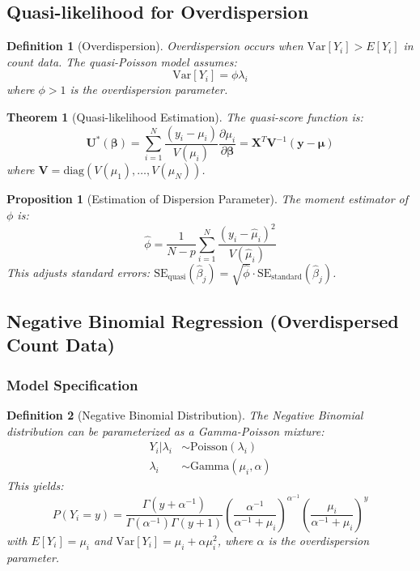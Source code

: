 \documentclass{article}
\newtheorem{definition}{Definition}
\newtheorem{theorem}{Theorem}
\newtheorem{proposition}{Proposition}
\begin{document}
\subsection{Quasi-likelihood for Overdispersion}

\begin{definition}[Overdispersion]
Overdispersion occurs when $\text{Var}[Y_i] > E[Y_i]$ in count data. The quasi-Poisson model assumes:
\begin{equation}
\text{Var}[Y_i] = \phi \lambda_i
\end{equation}
where $\phi > 1$ is the overdispersion parameter.
\end{definition}

\begin{theorem}[Quasi-likelihood Estimation]
The quasi-score function is:
\begin{equation}
\mathbf{U}^*(\boldsymbol{\beta}) = \sum_{i=1}^N \frac{(y_i - \mu_i)}{V(\mu_i)}\frac{\partial\mu_i}{\partial\boldsymbol{\beta}} = \mathbf{X}^T\mathbf{V}^{-1}(\mathbf{y} - \boldsymbol{\mu})
\end{equation}
where $\mathbf{V} = \text{diag}(V(\mu_1), \ldots, V(\mu_N))$.
\end{theorem}

\begin{proposition}[Estimation of Dispersion Parameter]
The moment estimator of $\phi$ is:
\begin{equation}
\hat{\phi} = \frac{1}{N-p}\sum_{i=1}^N \frac{(y_i - \hat{\mu}_i)^2}{V(\hat{\mu}_i)}
\end{equation}
This adjusts standard errors: $\text{SE}_{\text{quasi}}(\hat{\beta}_j) = \sqrt{\hat{\phi}} \cdot \text{SE}_{\text{standard}}(\hat{\beta}_j)$.
\end{proposition}

\subsection{Negative Binomial Regression (Overdispersed Count Data)}

\subsubsection{Model Specification}

\begin{definition}[Negative Binomial Distribution]
The Negative Binomial distribution can be parameterized as a Gamma-Poisson mixture:
\begin{align}
Y_i|\lambda_i &\sim \text{Poisson}(\lambda_i) \\
\lambda_i &\sim \text{Gamma}(\mu_i, \alpha)
\end{align}
This yields:
\begin{equation}
P(Y_i = y) = \frac{\Gamma(y + \alpha^{-1})}{\Gamma(\alpha^{-1})\Gamma(y+1)} \left(\frac{\alpha^{-1}}{\alpha^{-1} + \mu_i}\right)^{\alpha^{-1}} \left(\frac{\mu_i}{\alpha^{-1} + \mu_i}\right)^y
\end{equation}
with $E[Y_i] = \mu_i$ and $\text{Var}[Y_i] = \mu_i + \alpha\mu_i^2$, where $\alpha$ is the overdispersion parameter.
\end{definition}
\end{document}
